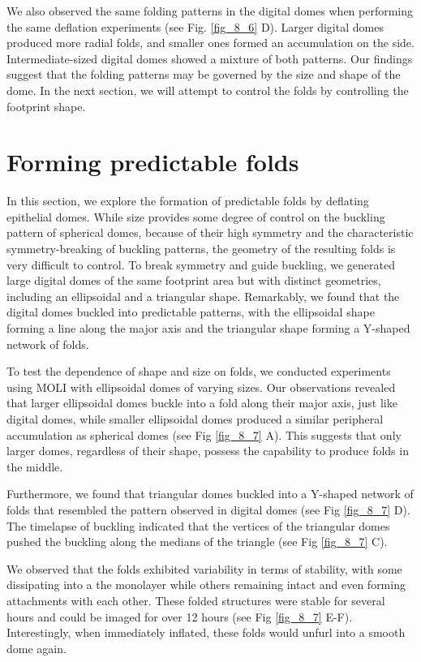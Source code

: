 We also observed the same folding patterns in the digital domes when performing the same deflation experiments (see Fig. \ref{fig_8_6} D). Larger digital domes produced more radial folds, and smaller ones formed an accumulation on the side. Intermediate-sized digital domes showed a mixture of both patterns.
Our findings suggest that the folding patterns may be governed by the size and shape of the dome. In the next section, we will attempt to control the folds by controlling the footprint shape.

\hypertarget{forming-predictable-folds}{%
	\section{Forming predictable folds}\label{forming-predictable-folds}}

In this section, we explore the formation of predictable folds by deflating epithelial domes. While size provides some degree of control on the buckling pattern of spherical domes, because of their high symmetry and the characteristic symmetry-breaking of buckling patterns, the geometry of the resulting folds is very difficult to control. To break symmetry and guide buckling, we generated large digital domes of the same footprint area but with distinct geometries, including an ellipsoidal and a triangular shape. Remarkably, we found that the digital domes buckled into predictable patterns, with the ellipsoidal shape forming a line along the major axis and the triangular shape forming a Y-shaped network of folds.

To test the dependence of shape and size on folds, we conducted experiments using MOLI with ellipsoidal domes of varying sizes. Our observations revealed that larger ellipsoidal domes buckle into a fold along their major axis, just like digital domes, while smaller ellipsoidal domes produced a similar peripheral accumulation as spherical domes (see Fig \ref{fig_8_7} A). This suggests that only larger domes, regardless of their shape, possess the capability to produce folds in the middle.
 
Furthermore, we found that triangular domes buckled into a Y-shaped network of folds that resembled the pattern observed in digital domes (see Fig \ref{fig_8_7} D). The timelapse of buckling indicated that the vertices of the triangular domes pushed the buckling along the medians of the triangle (see Fig \ref{fig_8_7} C).

We observed that the folds exhibited variability in terms of stability, with some dissipating into a the monolayer while others remaining intact and even forming attachments with each other.  These folded structures were stable for several hours and could be imaged for over 12 hours (see Fig \ref{fig_8_7} E-F). Interestingly, when immediately inflated, these folds would unfurl into a smooth dome again.

